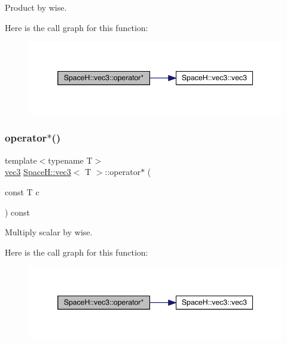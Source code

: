 Product by wise. 

Here is the call graph for this function\+:
\nopagebreak
\begin{figure}[H]
\begin{center}
\leavevmode
\includegraphics[width=346pt]{struct_space_h_1_1vec3_a5399298171d5e12e7b76ade00ab7d67d_cgraph}
\end{center}
\end{figure}
\mbox{\label{struct_space_h_1_1vec3_adb9a23774fc263d23487bdc6d2e253ce}} 
\subsubsection{\texorpdfstring{operator$\ast$()}{operator*()}\hspace{0.1cm}{\footnotesize\ttfamily [5/7]}}
{\footnotesize\ttfamily template$<$typename T$>$ \\
\mbox{\hyperlink{struct_space_h_1_1vec3}{vec3}} \mbox{\hyperlink{struct_space_h_1_1vec3}{Space\+H\+::vec3}}$<$ T $>$\+::operator$\ast$ (\begin{DoxyParamCaption}\item[{const T}]{c }\end{DoxyParamCaption}) const\hspace{0.3cm}{\ttfamily [inline]}}



Multiply scalar by wise. 

Here is the call graph for this function\+:
\nopagebreak
\begin{figure}[H]
\begin{center}
\leavevmode
\includegraphics[width=346pt]{struct_space_h_1_1vec3_adb9a23774fc263d23487bdc6d2e253ce_cgraph}
\end{center}
\end{figure}
\mbox{\label{struct_space_h_1_1vec3_adb9a23774fc263d23487bdc6d2e253ce}} 
